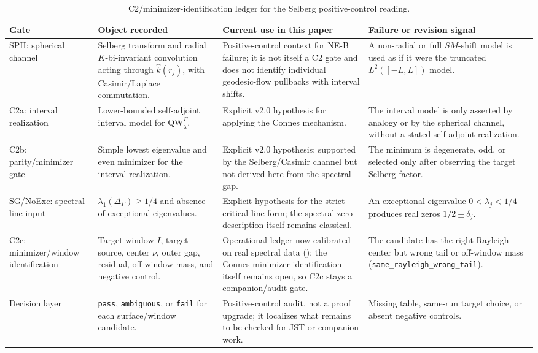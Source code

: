\documentclass[12pt,a4paper]{article}
\theoremstyle{definition}
\theoremstyle{remark}
\newcommand{\QW}{\mathrm{QW}}
\newcommand{\Delop}{\Delta_{\Gamma}}
\begin{document}
\begin{table}[htp]
\centering
\small
\setlength{\tabcolsep}{3pt}
{\renewcommand{\arraystretch}{1.16}
\begin{tabularx}{\textwidth}{@{}L{0.18\textwidth}YYY@{}}
\toprule
Gate & Object recorded & Current use in this paper & Failure or revision signal \\
\midrule
SPH: spherical channel
  & Selberg transform and radial \(K\)-bi-invariant convolution acting through
    \(\widehat{k}(r_j)\), with Casimir/Laplace commutation.
  & Positive-control context for NE-B failure; it is not itself a C2 gate and
    does not identify individual geodesic-flow pullbacks with interval shifts.
  & A non-radial or full \(SM\)-shift model is used as if it were the truncated
    \(L^2([-L,L])\) model. \\
C2a: interval realization
  & Lower-bounded self-adjoint interval model for \(\QW^\Gamma_\lambda\).
  & Explicit v2.0 hypothesis for applying the Connes mechanism.
  & The interval model is only asserted by analogy or by the spherical channel,
    without a stated self-adjoint realization. \\
C2b: parity/minimizer gate
  & Simple lowest eigenvalue and even minimizer for the interval realization.
  & Explicit v2.0 hypothesis; supported by the Selberg/Casimir channel but not
    derived here from the spectral gap.
  & The minimum is degenerate, odd, or selected only after observing the target
    Selberg factor. \\
SG/NoExc: spectral-line input
  & \(\lambda_1(\Delop)\ge 1/4\) and absence of exceptional eigenvalues.
  & Explicit hypothesis for the strict critical-line form; the spectral zero
    description itself remains classical.
  & An exceptional eigenvalue \(0<\lambda_j<1/4\) produces real zeros
    \(1/2\pm\delta_j\). \\
C2c: minimizer/window identification
  & Target window \(I\), target source, center \(\nu\), outer gap, residual,
    off-window mass, and negative control.
  & Operational ledger now calibrated on real spectral data
    (); the Connes-minimizer identification itself
    remains open, so C2c stays a companion/audit gate.
  & The candidate has the right Rayleigh center but wrong tail or off-window mass
    (\texttt{same\_rayleigh\_}\allowbreak\texttt{wrong\_tail}). \\
Decision layer
  & \texttt{pass}, \texttt{ambiguous}, or \texttt{fail} for each surface/window
    candidate.
  & Positive-control audit, not a proof upgrade; it localizes what remains to be
    checked for JST or companion work.
  & Missing table, same-run target choice, or absent negative controls. \\
\bottomrule
\end{tabularx}}
\caption{C2/minimizer-identification ledger for the Selberg positive-control reading.}
\label{tab:c2-minimizer-ledger}
\end{table}
\end{document}
